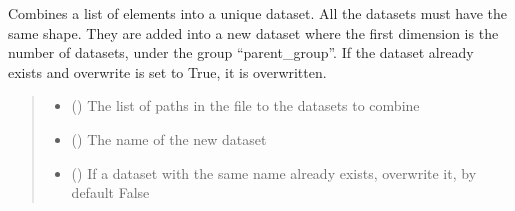 \documentclass[letterpaper,10pt,english]{sphinxmanual}
\begin{document}
\begin{fulllineitems}
\begin{fulllineitems}
\label{\detokenize{_autosummary/HDF5_BLS.wrapper:HDF5_BLS.wrapper.Wrapper.combine_datasets}}
\pysigstartsignatures
\pysiglinewithargsret
{}
{\sphinxparamcomma {}\sphinxparamcomma {}\sphinxparamcomma {}}
{}
\pysigstopsignatures
\sphinxAtStartPar
Combines a list of elements into a unique dataset. All the datasets must have the same shape. They are added into a new dataset where the first dimension is the number of datasets, under the group “parent\_group”. If the dataset already exists and overwrite is set to True, it is overwritten.
\begin{quote}\begin{description}
\begin{itemize}
\item {} 
\sphinxAtStartPar
{} () \textendash{} The list of paths in the file to the datasets to combine

\item {} 
\sphinxAtStartPar
{} () \textendash{} The name of the new dataset

\item {} 
\sphinxAtStartPar
{} (\sphinxstyleliteralemphasis{\sphinxupquote{, }}) \textendash{} If a dataset with the same name already exists, overwrite it, by default False

\end{itemize}

\end{description}\end{quote}

\end{fulllineitems}



\end{fulllineitems}
\end{document}
